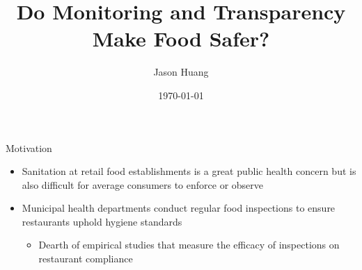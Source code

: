 \documentclass[handout]{beamer}
\title[Food Inspection]{Do Monitoring and Transparency Make Food Safer?}
\subtitle{}
\author{Jason Huang}
\date{\today}
\begin{document}
\newcommand{\cfbox}[2]{%
    \colorlet{currentcolor}{.}%
    {\color{#1}%
    \fbox{\color{currentcolor}#2}}%
}
\begin{frame}
  \titlepage
\end{frame}




\begin{frame}{Motivation}
\begin{itemize}
    \item Sanitation at retail food establishments is a great public health concern but is also difficult for average consumers to enforce or observe
    \pause
    \item Municipal health departments conduct regular food inspections to ensure restaurants uphold hygiene standards
    \begin{itemize}
    \item Dearth of empirical studies that measure the efficacy of inspections on restaurant compliance
    \end{itemize}
    \end{itemize}
    

\end{frame}
\end{document}
